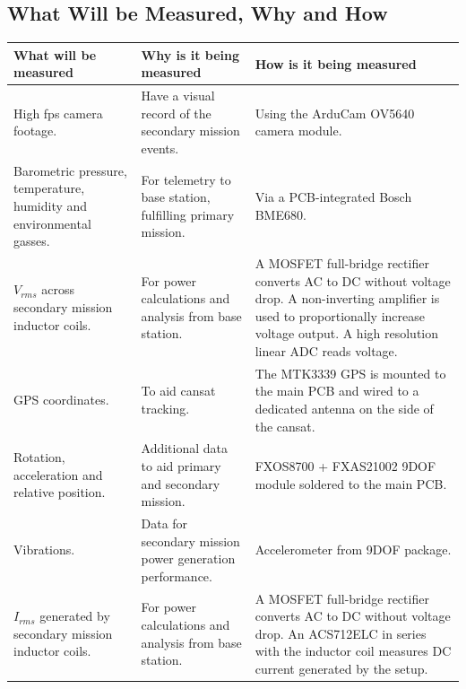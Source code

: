 \documentclass{report}
\begin{document}
		\subsection{What Will be Measured, Why and How}
		\begin{table}[h!]
		\setlength{\tabcolsep}{6pt}
		\begin{tabularx}{\textwidth}{@{} YYY @{}}
        		\toprule
        		\textbf{What will be measured} & 
		       \textbf{Why is it being measured} & 
		       \textbf{How is it being measured}\\
		       \midrule
		
		       High fps camera footage. 
		       & Have a visual record of the secondary mission events. 
		       & Using the ArduCam OV5640 camera module.\\
		
		       \addlinespace
		       Barometric pressure, temperature, humidity and environmental gasses. 
		       & For telemetry to base station, fulfilling primary mission. 
		       & Via a PCB-integrated Bosch BME680.\\
		
		       \addlinespace
		       $V_{rms}$ across secondary mission inductor coils. 
		       & For power calculations and analysis from base station. 
		       & A MOSFET full-bridge rectifier converts AC to DC without voltage
			drop. A non-inverting amplifier is used to proportionally increase voltage
			output. A high resolution linear ADC reads voltage.\\
		
		       \addlinespace
		       GPS coordinates. 
		       & To aid cansat tracking. 
		       & The MTK3339 GPS is mounted to the main PCB and wired to a
			dedicated antenna on the side of the cansat.\\
		
		      \addlinespace
		      Rotation, acceleration and relative position. 
		      & Additional data to aid primary and secondary mission. 
		      & FXOS8700 + FXAS21002 9DOF module soldered to the main PCB.\\
		
		      \addlinespace
		      Vibrations. 
		      & Data for secondary mission power generation performance. 
		      & Accelerometer from 9DOF package.\\
	
		      \addlinespace
		      $I_{rms}$ generated by secondary mission inductor coils. 
		      & For power calculations and analysis from base station. 
		      & A MOSFET full-bridge rectifier converts AC to DC without voltage
			drop. An ACS712ELC in series with the inductor coil measures DC 
			current generated by the setup. \\
		     \bottomrule
		\end{tabularx}
		\end{table}
		\vspace{6pt}
\end{document}
